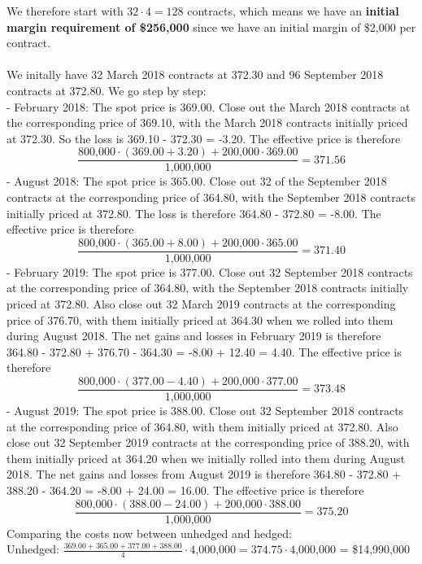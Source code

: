 \documentclass{article}
\begin{document}
{We therefore start with \(32 \cdot 4 = 128\) contracts, which means we have an \textbf{initial margin requirement of \$256,000} since we have an initial margin of \$2,000 per contract. \\ \\
We initally have 32 March 2018 contracts at 372.30 and 96 September 2018 contracts at 372.80. We go step by step: \\
- February 2018: The spot price is 369.00. Close out the March 2018 contracts at the corresponding price of 369.10, with the March 2018 contracts initially priced at 372.30. So the loss is 369.10 - 372.30 = -3.20. The effective price is therefore 
\[
  \frac{\text{800,000} \cdot (369.00 + 3.20) + \text{200,000} \cdot 369.00 }{\text{1,000,000}} = 371.56
\]
- August 2018: The spot price is 365.00. Close out 32 of the September 2018 contracts at the corresponding price of 364.80, with the September 2018 contracts initially priced at 372.80. The loss is therefore 364.80 - 372.80 = -8.00. The effective price is therefore 
\[
  \frac{\text{800,000} \cdot (365.00 + 8.00) + \text{200,000} \cdot 365.00 }{\text{1,000,000}} = 371.40
\]
- February 2019: The spot price is 377.00. Close out 32 September 2018 contracts at the corresponding price of 364.80, with the September 2018 contracts initially priced at 372.80. Also close out 32 March 2019 contracts at the corresponding price of 376.70, with them initially priced at 364.30 when we rolled into them during August 2018. The net gains and losses in February 2019 is therefore 364.80 - 372.80 + 376.70 - 364.30 = -8.00 + 12.40 = 4.40. The effective price is therefore 
\[
  \frac{\text{800,000} \cdot (377.00 - 4.40) + \text{200,000} \cdot 377.00 }{\text{1,000,000}} = 373.48
\]
- August 2019: The spot price is 388.00. Close out 32 September 2018 contracts at the corresponding price of 364.80, with them initially priced at 372.80. Also close out 32 September 2019 contracts at the corresponding price of 388.20, with them initially priced at 364.20 when we initially rolled into them during August 2018. The net gains and losses from August 2019 is therefore 364.80 - 372.80 + 388.20 - 364.20 = -8.00 + 24.00 = 16.00. The effective price is therefore 
\[
  \frac{\text{800,000} \cdot (388.00 - 24.00) + \text{200,000} \cdot 388.00 }{\text{1,000,000}} = 375.20
\]
Comparing the costs now between unhedged and hedged: \\
Unhedged: \(\frac{369.00 + 365.00 + 377.00 + 388.00}{4} \cdot \text{4,000,000} = 374.75 \cdot \text{4,000,000}\) = \$14,990,000 \\ 
}
\end{document}
